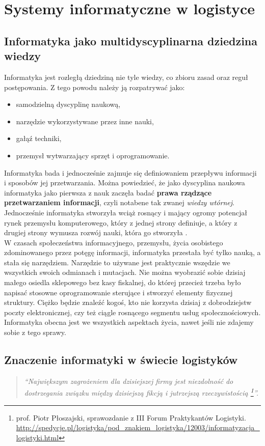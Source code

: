\chapter{Systemy informatyczne w logistyce}
\label{c3:c3}

\section{Informatyka jako multidyscyplinarna dziedzina wiedzy}
	Informatyka jest rozległą dziedziną nie tyle wiedzy, co zbioru zasad oraz reguł postępowania.
	Z tego powodu należy ją rozpatrywać jako:
	\begin{itemize}
		\item samodzielną dyscyplinę naukową,
		\item narzędzie wykorzystywane przez inne nauki,
		\item gałąź techniki,
		\item przemysł wytwarzający sprzęt i oprogramowanie.
	\end{itemize}	 

	Informatyka bada i jednocześnie zajmuje się definiowaniem przepływu informacji i sposobów jej przetwarzania. 
	Można powiedzieć, że jako dyscyplina naukowa informatyka 
	jako pierwsza z nauk zaczęła badać \textbf{prawa rządzące przetwarzaniem informacji}, czyli notabene
	tak zwanej \emph{wiedzy wtórnej}. Jednocześnie informatyka stworzyła wciąż rosnący i mający 
	ogromy potencjał rynek przemysłu komputerowego, który z jednej strony definiuje, a który 
	z drugiej strony wymusza rozwój nauki, która go stworzyła \cite{it_definition}.\\
	
	W czasach społeczeństwa informacyjnego, przemysłu, życia osobistego zdominowanego przez potęgę informacji, informatyka
	przestała być tylko nauką, a stała się narzędziem. Narzędzie to używane jest praktycznie wszędzie
	we wszystkich swoich odmianach i mutacjach. Nie można wyobrazić sobie dzisiaj małego osiedla sklepowego bez
	kasy fiskalnej, do której przecież trzeba było napisać stosowne oprogramowanie sterujące i stworzyć
	elementy fizycznej struktury. Ciężko będzie znaleźć kogoś, kto nie korzysta dzisiaj z dobrodziejstw poczty
	elektronicznej, czy też ciągle rosnącego segmentu usług społecznościowych. Informatyka obecna jest we
	wszystkich aspektach życia, nawet jeśli nie zdajemy sobie z tego sprawy.
	
\section{Znaczenie informatyki w świecie logistyków}
	\begin{quote}
		\textit{
			``Największym zagrożeniem dla dzisiejszej firmy jest niezdolność do dostrzegania związku
			między dzisiejszą fikcją i jutrzejszą rzeczywistością
			\footnote{prof. Piotr Płoszajski, sprawozdanie z III Forum Praktykantów Logistyki.\\
			\url{http://spedycje.pl/logistyka/pod_znakiem_logistyka/12003/informatyzacja_logistyki.html}}''.
		}
	\end{quote}

